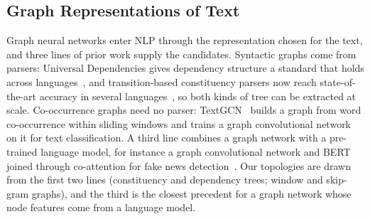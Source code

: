 \subsection{Graph Representations of Text} \label{text_trees}

Graph neural networks enter NLP through the representation chosen for the text, and three lines of prior work supply the candidates. Syntactic graphs come from parsers: Universal Dependencies gives dependency structure a standard that holds across languages~\cite{de-marneffe-etal-2021-universal}, and transition-based constituency parsers now reach state-of-the-art accuracy in several languages~\cite{bauer-manning-2025-high}, so both kinds of tree can be extracted at scale. Co-occurrence graphs need no parser: TextGCN~\cite{yao2019textgcn} builds a graph from word co-occurrence within sliding windows and trains a graph convolutional network on it for text classification. A third line combines a graph network with a pre-trained language model, for instance a graph convolutional network and BERT joined through co-attention for fake news detection~\cite{zhang2024gbca}. Our topologies are drawn from the first two lines (constituency and dependency trees; window and skip-gram graphs), and the third is the closest precedent for a graph network whose node features come from a language model.
